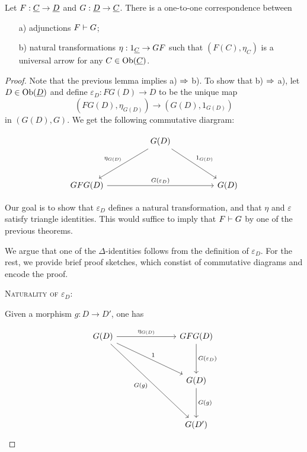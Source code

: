 \begin{theorem*}
	Let \( F: \underline{C} \to \underline{D} \) and \( G: \underline{D} \to \underline{C} \). There is a one-to-one correspondence between
	\begin{itemize}
		\item[a)] adjunctions \( F \mathrel{\vdash} G \);
		\item[b)] natural transformations \( \eta: 1_{\underline{C}} \to GF \) such that \( (F(C), \eta_C) \) is a universal arrow for any \( C \in \operatorname{Ob}(\underline{C}) \).
	\end{itemize}
\end{theorem*}
\begin{proof}
	Note that the previous lemma implies a) \( \Rightarrow \) b). To show that b) \( \Rightarrow \) a), let \( D \in \operatorname{Ob}(\underline{D}) \) and define \( \varepsilon_D: FG(D) \to D \) to be the unique map
	\[
		(FG(D), \eta_{G(D)}) \to (G(D), 1_{G(D)})
	\]
	in \( (G(D) \comma G) \). We get the following commutative diargram:

	\[
		\begin{tikzcd}
			&& {G(D)} \\
			\\
			{GFG(D)} &&&& {G(D)}
			\arrow["{\eta_{G(D)}}"', from=1-3, to=3-1]
			\arrow["1_{G(D)}", from=1-3, to=3-5]
			\arrow["{G(\varepsilon_D)}", from=3-1, to=3-5]
		\end{tikzcd}
	\]

	Our goal is to show that \( \varepsilon_D \) defines a natural transformation, and that \( \eta \) and \( \varepsilon \) satisfy triangle identities. This would suffice to imply that \( F \mathrel{\vdash} G \) by one of the previous theorems.

	\vspace*{2mm}

	We argue that one of the \( \Delta \)-identities follows from the definition of \( \varepsilon_D \). For the rest, we provide brief proof sketches, which constist of commutative diagrams and encode the proof.
	\vspace*{3mm}

	\newpage
	\textsc{Naturality of \( \varepsilon_D \)}:

	\vspace*{3mm}

	Given a morphism \( g: D \to D' \), one has

	\[
		\begin{tikzcd}{G(D)} &&& {GFG(D)} \\
			\\
			&&& {G(D)} \\
			\\
			&&& {G(D')}
			\arrow["{\eta_{G(D)}}", from=1-1, to=1-4]
			\arrow["1", from=1-1, to=3-4]
			\arrow["{G(g)}"', from=1-1, to=5-4]
			\arrow["{G(\varepsilon_D)}", from=1-4, to=3-4]
			\arrow["{G(g)}", from=3-4, to=5-4]
		\end{tikzcd}
	\]


\end{proof}
